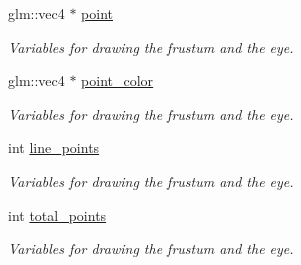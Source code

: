 {\bf }\par
\begin{DoxyCompactItemize}
\item 
glm\+::vec4 $\ast$ \hyperlink{classcft_1_1Scene_a377d9bbfd0047a9a07ea9347f507fb88}{point}\hypertarget{classcft_1_1Scene_a377d9bbfd0047a9a07ea9347f507fb88}{}\label{classcft_1_1Scene_a377d9bbfd0047a9a07ea9347f507fb88}

\begin{DoxyCompactList}\small\item\em Variables for drawing the frustum and the eye. \end{DoxyCompactList}\item 
glm\+::vec4 $\ast$ \hyperlink{classcft_1_1Scene_a463f2eb19cee1910e13cdb7421bbd3bd}{point\+\_\+color}\hypertarget{classcft_1_1Scene_a463f2eb19cee1910e13cdb7421bbd3bd}{}\label{classcft_1_1Scene_a463f2eb19cee1910e13cdb7421bbd3bd}

\begin{DoxyCompactList}\small\item\em Variables for drawing the frustum and the eye. \end{DoxyCompactList}\item 
int \hyperlink{classcft_1_1Scene_a39be0992b45b2bdebf72b1836ed3e75d}{line\+\_\+points}\hypertarget{classcft_1_1Scene_a39be0992b45b2bdebf72b1836ed3e75d}{}\label{classcft_1_1Scene_a39be0992b45b2bdebf72b1836ed3e75d}

\begin{DoxyCompactList}\small\item\em Variables for drawing the frustum and the eye. \end{DoxyCompactList}\item 
int \hyperlink{classcft_1_1Scene_a2a239e0ae018cd4efe5104b037c324da}{total\+\_\+points}\hypertarget{classcft_1_1Scene_a2a239e0ae018cd4efe5104b037c324da}{}\label{classcft_1_1Scene_a2a239e0ae018cd4efe5104b037c324da}

\begin{DoxyCompactList}\small\item\em Variables for drawing the frustum and the eye. \end{DoxyCompactList}\end{DoxyCompactItemize}

